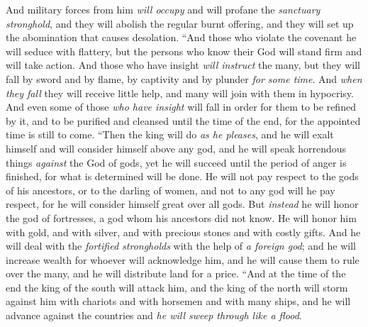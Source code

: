 \begin{biblechapter}
\verse And military forces from him \textit{will occupy} and will profane the \textit{sanctuary stronghold}, and they will abolish the regular burnt offering, and they will set up the abomination that causes desolation.
\verse “And those who violate the covenant he will seduce with flattery, but the persons who know their God will stand firm and will take action.
\verse And those who have insight \textit{will instruct} the many, but they will fall by sword and by flame, by captivity and by plunder \textit{for some time}.
\verse And \textit{when they fall} they will receive little help, and many will join with them in hypocrisy.
\verse And even some of those \textit{who have insight}﻿ will fall in order for them to be refined by it, and to be purified and cleansed until the time of the end, for the appointed time is still to come.
\verse “Then the king will do \textit{as he pleases}, and he will exalt himself and will consider himself above any god, and he will speak horrendous things \textit{against} the God of gods, yet he will succeed until the period of anger is finished, for what is determined will be done.
\verse He will not pay respect to the gods of his ancestors, or to the darling of women, and not to any god will he pay respect, for he will consider himself great over all gods.
\verse But \textit{instead} he will honor the god of fortresses, a god whom his ancestors did not know. He will honor him with gold, and with silver, and with precious stones and with costly gifts.
\verse And he will deal with the \textit{fortified strongholds} with the help of \textit{a foreign god}; and he will increase wealth for whoever will acknowledge him, and he will cause them to rule over the many, and he will distribute land for a price.
\verse “And at the time of the end the king of the south will attack him, and the king of the north will storm against him with chariots and with horsemen and with many ships, and he will advance against the countries and \textit{he will sweep through like a flood}.

\end{biblechapter}
